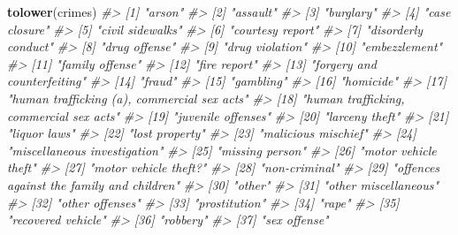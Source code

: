 \documentclass[
  12pt,
]{book}
\newenvironment{Shaded}{\begin{snugshade}}{\end{snugshade}}
\newcommand{\CommentTok}[1]{\textcolor[rgb]{0.37,0.37,0.37}{\textit{#1}}}
\newcommand{\KeywordTok}[1]{\textcolor[rgb]{0.27,0.27,0.27}{\textbf{#1}}}
\newcommand{\NormalTok}[1]{#1}
\begin{document}
\begin{Shaded}
\begin{Highlighting}[]
\KeywordTok{tolower}\NormalTok{(crimes)}
\CommentTok{\#>  [1] "arson"                                     }
\CommentTok{\#>  [2] "assault"                                   }
\CommentTok{\#>  [3] "burglary"                                  }
\CommentTok{\#>  [4] "case closure"                              }
\CommentTok{\#>  [5] "civil sidewalks"                           }
\CommentTok{\#>  [6] "courtesy report"                           }
\CommentTok{\#>  [7] "disorderly conduct"                        }
\CommentTok{\#>  [8] "drug offense"                              }
\CommentTok{\#>  [9] "drug violation"                            }
\CommentTok{\#> [10] "embezzlement"                              }
\CommentTok{\#> [11] "family offense"                            }
\CommentTok{\#> [12] "fire report"                               }
\CommentTok{\#> [13] "forgery and counterfeiting"                }
\CommentTok{\#> [14] "fraud"                                     }
\CommentTok{\#> [15] "gambling"                                  }
\CommentTok{\#> [16] "homicide"                                  }
\CommentTok{\#> [17] "human trafficking (a), commercial sex acts"}
\CommentTok{\#> [18] "human trafficking, commercial sex acts"    }
\CommentTok{\#> [19] "juvenile offenses"                         }
\CommentTok{\#> [20] "larceny theft"                             }
\CommentTok{\#> [21] "liquor laws"                               }
\CommentTok{\#> [22] "lost property"                             }
\CommentTok{\#> [23] "malicious mischief"                        }
\CommentTok{\#> [24] "miscellaneous investigation"               }
\CommentTok{\#> [25] "missing person"                            }
\CommentTok{\#> [26] "motor vehicle theft"                       }
\CommentTok{\#> [27] "motor vehicle theft?"                      }
\CommentTok{\#> [28] "non{-}criminal"                              }
\CommentTok{\#> [29] "offences against the family and children"  }
\CommentTok{\#> [30] "other"                                     }
\CommentTok{\#> [31] "other miscellaneous"                       }
\CommentTok{\#> [32] "other offenses"                            }
\CommentTok{\#> [33] "prostitution"                              }
\CommentTok{\#> [34] "rape"                                      }
\CommentTok{\#> [35] "recovered vehicle"                         }
\CommentTok{\#> [36] "robbery"                                   }
\CommentTok{\#> [37] "sex offense"                               }

\end{Highlighting}
\end{Shaded}
\end{document}
